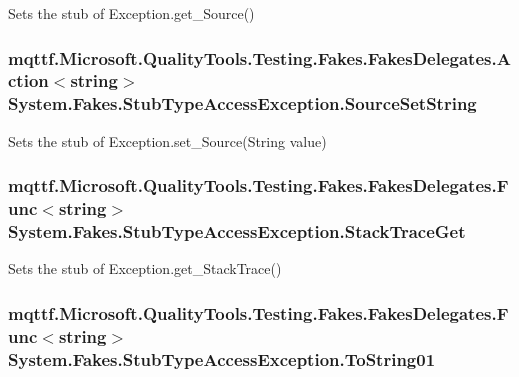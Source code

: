 Sets the stub of Exception.\-get\-\_\-\-Source()

\hypertarget{class_system_1_1_fakes_1_1_stub_type_access_exception_aaee6a9e22792c1f3d0d783a8f39bd1be}{
\subsubsection[{Source\-Set\-String}]{\setlength{\rightskip}{0pt plus 5cm}mqttf.\-Microsoft.\-Quality\-Tools.\-Testing.\-Fakes.\-Fakes\-Delegates.\-Action$<$string$>$ System.\-Fakes.\-Stub\-Type\-Access\-Exception.\-Source\-Set\-String}}\label{class_system_1_1_fakes_1_1_stub_type_access_exception_aaee6a9e22792c1f3d0d783a8f39bd1be}


Sets the stub of Exception.\-set\-\_\-\-Source(\-String value)

\hypertarget{class_system_1_1_fakes_1_1_stub_type_access_exception_a36d36a364a5658cb66f50f8faa2dc746}{
\subsubsection[{Stack\-Trace\-Get}]{\setlength{\rightskip}{0pt plus 5cm}mqttf.\-Microsoft.\-Quality\-Tools.\-Testing.\-Fakes.\-Fakes\-Delegates.\-Func$<$string$>$ System.\-Fakes.\-Stub\-Type\-Access\-Exception.\-Stack\-Trace\-Get}}\label{class_system_1_1_fakes_1_1_stub_type_access_exception_a36d36a364a5658cb66f50f8faa2dc746}


Sets the stub of Exception.\-get\-\_\-\-Stack\-Trace()

\hypertarget{class_system_1_1_fakes_1_1_stub_type_access_exception_aae3837903b86721bfc38f91dc8214c6d}{
\subsubsection[{To\-String01}]{\setlength{\rightskip}{0pt plus 5cm}mqttf.\-Microsoft.\-Quality\-Tools.\-Testing.\-Fakes.\-Fakes\-Delegates.\-Func$<$string$>$ System.\-Fakes.\-Stub\-Type\-Access\-Exception.\-To\-String01}}\label{class_system_1_1_fakes_1_1_stub_type_access_exception_aae3837903b86721bfc38f91dc8214c6d}


